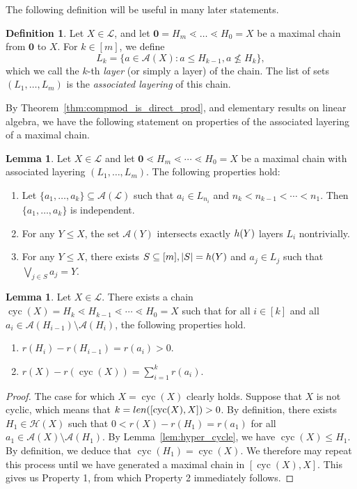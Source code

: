 \documentclass[a4paper,11pt,reqno]{article}
\theoremstyle{definition}
\newtheorem{definition}[theorem]{{{Definition}}}
\newtheorem{lemma}[theorem]{{{Lemma}}}
\newcommand{\mA}{\mathcal{A}}
\newcommand{\len}{\textup{len}}
\newcommand{\h}{\textup{h}}
\newcommand{\zero}{{\mathbf{0}}}
\DeclareMathOperator{\cyc}{cyc}
\begin{document}
The following definition will be useful in many later statements.

\begin{definition}\label{def:layers}
    Let $X\in\mathcal{L}$, and let $\zero=H_m\lessdot\dots\lessdot H_0 =X$ be a maximal chain from $\zero$ to $X$. For $k \in [m]$, we define
    \[
    L_k=\{a\in\mA(X):a\leq H_{k-1},a\nleq H_k\},
    \]
    which we call the $k$-th {\em layer} (or simply a layer) of the chain. The list of sets $(L_1,\dots,L_m)$ is the \emph{associated layering} of this chain. 
\end{definition}


 By Theorem~\ref{thm:compmod_is_direct_prod}, and elementary results on linear algebra, we have the following statement on properties of the associated layering of a maximal chain.
\begin{lemma}\label{lem:indep_layers_2_properties}
    Let $X\in\mathcal{L}$ and let $\zero\lessdot H_m\lessdot\cdots\lessdot H_0=X$ be a maximal chain with associated layering $(L_1,\dots,L_m)$. The following properties hold:
    \begin{enumerate}
        \item Let $\{a_1,\dots,a_k\}\subseteq\mathcal{A}(\mathcal{L})$ such that $a_i\in L_{n_i}$ and $n_k<n_{k-1}<\cdots<n_1$. Then $\{a_1,\dots,a_k\}$ is independent.
        \item For any $Y\leq X$, the set $\mA(Y)$ intersects exactly $\textup{h}(Y)$ layers $L_i$ nontrivially.
        \item For any $Y \leq X$, there exists $S \subseteq[m], |S|=\h(Y)$ and $a_j \in L_j$ such that $\bigvee_{j \in S} a_j = Y$.
    \end{enumerate}
\end{lemma}


\begin{lemma}\label{lem:max_chain_ranks}
    Let $X\in\mathcal{L}$. There exists a chain $\cyc(X)=H_k\lessdot H_{k-1}\lessdot\cdots\lessdot H_0=X$ such that for all $i\in[k]$ and all $a_i\in \mathcal{A}(H_{i-1})\setminus\mathcal{A}(H_i)$, the following properties hold. 
    \begin{enumerate}
        \item $r(H_i)-r(H_{i-1})=r(a_{i})>0$.
        \item $r(X)-r(\cyc(X))=\sum_{i=1}^kr(a_i)$.
    \end{enumerate}
\end{lemma}
\begin{proof}
    The case for which $X=\cyc(X)$ clearly holds. Suppose that $X$ is not cyclic, which means that $k=\len([\cyc(X),X])>0$. By definition, there exists $H_1\in\mathcal{H}(X)$ such that $0<r(X)-r(H_1)=r(a_1)$ for all $a_1\in\mathcal{A}(X)\setminus\mathcal{A}(H_1)$. By Lemma~\ref{lem:hyper_cycle}, we have $\cyc(X)\leq H_1$. By definition, we deduce that $\cyc(H_1)=\cyc(X)$. We therefore may repeat this process until we have generated a maximal chain in $[\cyc(X),X]$. This gives us Property 1, from which Property 2 immediately follows.
\end{proof}
\end{document}
